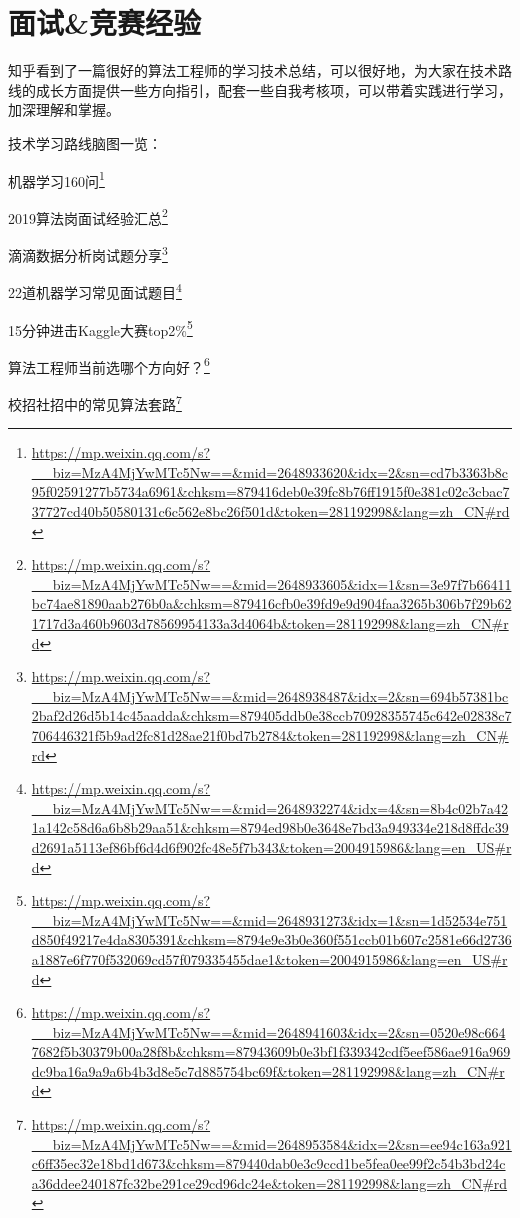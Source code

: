 \documentclass[]{ctexbook}
\renewcommand{\href}[2]{#2\footnote{\url{#1}}}
\begin{document}
\hypertarget{ux9762ux8bd5ux7adeux8d5bux7ecfux9a8c}{%
\section{面试\&竞赛经验}\label{ux9762ux8bd5ux7adeux8d5bux7ecfux9a8c}}

知乎看到了一篇很好的算法工程师的学习技术总结，可以很好地，为大家在技术路线的成长方面提供一些方向指引，配套一些自我考核项，可以带着实践进行学习，加深理解和掌握。

技术学习路线脑图一览：

\href{https://mp.weixin.qq.com/s?__biz=MzA4MjYwMTc5Nw==\&mid=2648933620\&idx=2\&sn=cd7b3363b8c95f02591277b5734a6961\&chksm=879416deb0e39fc8b76ff1915f0e381c02c3cbac737727cd40b50580131c6c562e8bc26f501d\&token=281192998\&lang=zh_CN\#rd}{机器学习160问}

\href{https://mp.weixin.qq.com/s?__biz=MzA4MjYwMTc5Nw==\&mid=2648933605\&idx=1\&sn=3e97f7b66411bc74ae81890aab276b0a\&chksm=879416cfb0e39fd9e9d904faa3265b306b7f29b621717d3a460b9603d78569954133a3d4064b\&token=281192998\&lang=zh_CN\#rd}{2019算法岗面试经验汇总}

\href{https://mp.weixin.qq.com/s?__biz=MzA4MjYwMTc5Nw==\&mid=2648938487\&idx=2\&sn=694b57381bc2baf2d26d5b14c45aadda\&chksm=879405ddb0e38ccb70928355745c642e02838c7706446321f5b9ad2fc81d28ae21f0bd7b2784\&token=281192998\&lang=zh_CN\#rd}{滴滴数据分析岗试题分享}

\href{https://mp.weixin.qq.com/s?__biz=MzA4MjYwMTc5Nw==\&mid=2648932274\&idx=4\&sn=8b4c02b7a421a142c58d6a6b8b29aa51\&chksm=8794ed98b0e3648e7bd3a949334e218d8ffdc39d2691a5113ef86bf6d4d6f902fc48e5f7b343\&token=2004915986\&lang=en_US\#rd}{22道机器学习常见面试题目}

\href{https://mp.weixin.qq.com/s?__biz=MzA4MjYwMTc5Nw==\&mid=2648931273\&idx=1\&sn=1d52534e751d850f49217e4da8305391\&chksm=8794e9e3b0e360f551ccb01b607c2581e66d2736a1887e6f770f532069cd57f079335455dae1\&token=2004915986\&lang=en_US\#rd}{15分钟进击Kaggle大赛top2\%}

\href{https://mp.weixin.qq.com/s?__biz=MzA4MjYwMTc5Nw==\&mid=2648941603\&idx=2\&sn=0520e98c6647682f5b30379b00a28f8b\&chksm=87943609b0e3bf1f339342cdf5eef586ae916a969dc9ba16a9a9a6b4b3d8e5c7d885754bc69f\&token=281192998\&lang=zh_CN\#rd}{算法工程师当前选哪个方向好？}

\href{https://mp.weixin.qq.com/s?__biz=MzA4MjYwMTc5Nw==\&mid=2648953584\&idx=2\&sn=ee94c163a921c6ff35ec32e18bd1d673\&chksm=879440dab0e3c9ccd1be5fea0ee99f2c54b3bd24ca36ddee240187fc32be291ce29cd96dc24e\&token=281192998\&lang=zh_CN\#rd}{校招社招中的常见算法套路}
\end{document}
